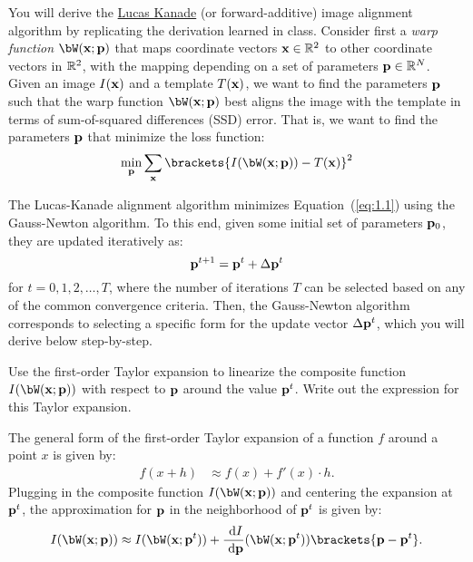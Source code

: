 \begin{problem}
  You will derive the \underline{Lucas Kanade} (or forward-additive)
  image alignment algorithm by replicating the derivation learned in class.
  Consider first a \emph{warp function} $\bW(\bx; \bp)$ that maps
  coordinate vectors $\mathbf{x} \in \mathbb{R}^2$ to other coordinate vectors in $\mathbb{R}^2$,
  with the mapping depending on a set of parameters $\mathbf{p} \in \mathbb{R}^N$.
  Given an image $I(\mathbf{x})$ and a template $T(\mathbf{x})$, we want to find the
  parameters $\mathbf{p}$ such that the warp function $\bW(\bx; \bp)$ best aligns
  the image with the template in terms of sum-of-squared differences (SSD)
  error. That is, we want to find the parameters $\mathbf{p}$ that minimize the
  loss function:
  \begin{equation}
    \min_\bp \sum_\bx \brackets{I(\bW(\bx; \bp)) - T(\bx)}^2
    \label{eq:1.1}
  \end{equation}

  The Lucas-Kanade alignment algorithm minimizes Equation~(\ref{eq:1.1}) using the
  Gauss-Newton algorithm. To this end, given some initial set of parameters
  $\mathbf{p}_0$, they are updated iteratively as:
  \begin{equation}
    \mathbf{p}^{t+1} = \mathbf{p}^t + \Delta \mathbf{p}^t
    \label{eq:1.2}
  \end{equation}
  for $t = 0, 1, 2, \ldots, T$, where the number of iterations $T$
  can be selected based on any of the common convergence criteria.
  Then, the Gauss-Newton algorithm corresponds to selecting
  a specific form for the update vector $\Delta \mathbf{p}^t$,
  which you will derive below step-by-step.

  \newpage
  \begin{enumroman}
    \item Use the first-order Taylor expansion to linearize the composite
      function $I(\bW(\bx; \bp))$ with respect to $\mathbf{p}$ around the value $\mathbf{p}^t$.
      Write out the expression for this Taylor expansion.

      \begin{answer}
        The general form of the first-order Taylor expansion of a function
        $f$ around a point $x$ is given by:
        \begin{align*}
          f(x + h) &\approx f(x) + f'(x) \cdot h.
        \end{align*}
        Plugging in the composite function $I(\bW(\bx; \bp))$ and centering
        the expansion at $\mathbf{p}^t$, the approximation for
        $\mathbf{p}$ in the neighborhood of $\mathbf{p}^t$ is given by:
        \begin{equation}
          I(\bW(\bx; \bp)) \approx
          I(\bW(\bx; \bp^t)) + \frac{\d I}{\d \bp} (\bW(\bx; \bp^t)) \brackets{\bp - \bp^t}.
          \label{eq:ans:1.1}
        \end{equation}
      \end{answer}


\end{enumroman}
\end{problem}
